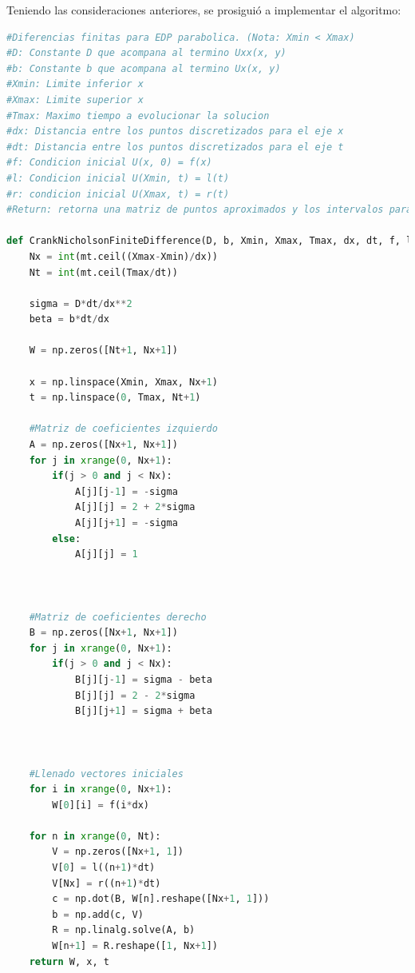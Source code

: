 \documentclass[letterpaper]{article}
\newcommand{\5}
{
\\[.5cm]
}
\begin{document}
\begin{itemize}
Teniendo las consideraciones anteriores, se prosiguió a implementar el algoritmo:

\begin{lstlisting}[language=Python]
#Diferencias finitas para EDP parabolica. (Nota: Xmin < Xmax)
#D: Constante D que acompana al termino Uxx(x, y)
#b: Constante b que acompana al termino Ux(x, y)
#Xmin: Limite inferior x
#Xmax: Limite superior x
#Tmax: Maximo tiempo a evolucionar la solucion
#dx: Distancia entre los puntos discretizados para el eje x
#dt: Distancia entre los puntos discretizados para el eje t
#f: Condicion inicial U(x, 0) = f(x)
#l: Condicion inicial U(Xmin, t) = l(t)
#r: condicion inicial U(Xmax, t) = r(t)
#Return: retorna una matriz de puntos aproximados y los intervalos para los ejes X e Y

def CrankNicholsonFiniteDifference(D, b, Xmin, Xmax, Tmax, dx, dt, f, l, r):
	Nx = int(mt.ceil((Xmax-Xmin)/dx))
	Nt = int(mt.ceil(Tmax/dt))

	sigma = D*dt/dx**2
	beta = b*dt/dx

	W = np.zeros([Nt+1, Nx+1])

	x = np.linspace(Xmin, Xmax, Nx+1)
	t = np.linspace(0, Tmax, Nt+1)

	#Matriz de coeficientes izquierdo
	A = np.zeros([Nx+1, Nx+1])
	for j in xrange(0, Nx+1):
		if(j > 0 and j < Nx):
			A[j][j-1] = -sigma
			A[j][j] = 2 + 2*sigma
			A[j][j+1] = -sigma
		else:
			A[j][j] = 1
	


	#Matriz de coeficientes derecho
	B = np.zeros([Nx+1, Nx+1])
	for j in xrange(0, Nx+1):
		if(j > 0 and j < Nx):
			B[j][j-1] = sigma - beta
			B[j][j] = 2 - 2*sigma
			B[j][j+1] = sigma + beta



	#Llenado vectores iniciales
	for i in xrange(0, Nx+1):
		W[0][i] = f(i*dx)

	for n in xrange(0, Nt):
		V = np.zeros([Nx+1, 1])
		V[0] = l((n+1)*dt)
		V[Nx] = r((n+1)*dt)
		c = np.dot(B, W[n].reshape([Nx+1, 1]))
		b = np.add(c, V)
		R = np.linalg.solve(A, b)
		W[n+1] = R.reshape([1, Nx+1])
	return W, x, t
\end{lstlisting}


\end{itemize}
\end{document}
